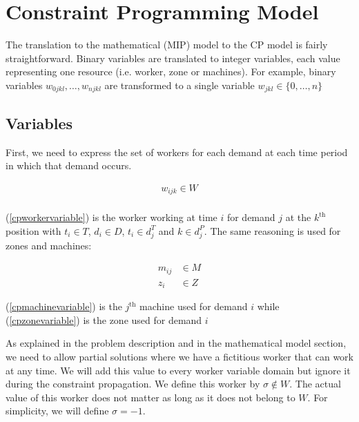 \documentclass[../../thesis.tex]{subfiles}
\begin{document}
\section{Constraint Programming Model}

The translation to the mathematical (MIP) model to the CP model is fairly
straightforward. Binary variables are translated to integer variables, each value representing
one resource (i.e. worker, zone or machines). 
For example, binary variables $w_{0jkl}, \dots, w_{njkl}$ are transformed to a single variable 
$w_{jkl} \in \{0, \dots, n\}$



\subsection{Variables}

First, we need to express the set of workers for each demand at each time period in which that demand occurs.

\begin{equation}
\begin{split}
    w_{ijk} \in W \label{cpworkervariable} \\
\end{split}
\end{equation}

(\ref{cpworkervariable}) is the worker working at time $i$ for demand $j$ at the $k^{\text{th}}$ position 
with $t_i \in T$, $d_i \in D$, $t_i \in d_j^T$ and $k \in d^P_j$. The same reasoning is used for zones and machines:

\begin{align}
    m_{ij} &\in M \label{cpmachinevariable} \\ 
    z_i &\in Z \label{cpzonevariable} 
\end{align}

(\ref{cpmachinevariable}) is the $j^{\text{th}}$ machine used for demand $i$ while (\ref{cpzonevariable}) is the zone used for demand $i$



As explained in the problem description and in the mathematical model section,
we need to allow partial solutions where we have a fictitious worker that can work at any time.
We will add this value to every worker variable domain but ignore it during the constraint propagation. We define 
this worker by $\sigma \notin W$. The actual value of this worker does not matter as long as it does not belong to $W$. For simplicity, we will define $\sigma = -1$.
\end{document}
